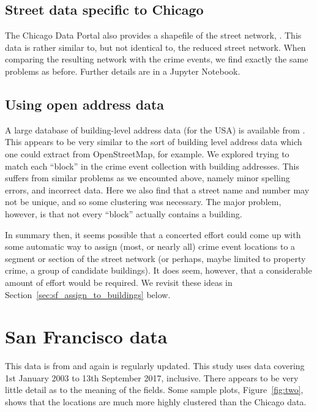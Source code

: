 \documentclass[twoside,a4paper,twocolumn,10pt]{article}
\theoremstyle{plain}
\theoremstyle{definition}
\begin{document}
\subsection{Street data specific to Chicago}

The Chicago Data Portal also provides a shapefile of the street network, \cite{cstreets}.
This data is rather similar to, but not identical to, the reduced street network.
When comparing the resulting network with the crime events, we find exactly the same
problems as before.  Further details are in a Jupyter Notebook.

\subsection{Using open address data}

A large database of building-level address data (for the USA) is available from
\cite{oa}.  This appears to be very similar to the sort of building level address
data which one could extract from OpenStreetMap, for example.  We explored trying to
match each ``block'' in the crime event collection with building addresses.  This
suffers from similar problems as we encounted above, namely minor spelling errors,
and incorrect data.  Here we also find that a street name and number may not be
unique, and so some clustering was necessary.  The major problem, however, is that
not every ``block'' actually contains a building.

In summary then, it seems possible that a concerted effort could come up with some
automatic way to assign (most, or nearly all) crime event locations to a segment or
section of the street network (or perhaps, maybe limited to property crime, a group
of candidate buildings).  It does seem, however, that a considerable amount of effort
would be required.  We revisit these ideas in Section~\ref{sec:sf_assign_to_buildings} below.




\section{San Francisco data}

This data is from \cite{sfdata} and again is regularly updated.  This study uses data
covering 1st January 2003 to 13th September 2017, inclusive.
There appears to be very
little detail as to the meaning of the fields.  Some sample plots, Figure~\ref{fig:two},
shows that the locations are much more highly clustered than the Chicago data.
\end{document}
